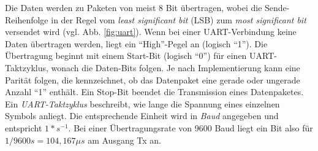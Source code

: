 Die Daten werden zu Paketen von meist 8 Bit übertragen, wobei die Sende-Reihenfolge in der Regel vom \textit{least significant bit} (LSB) zum \textit{most significant bit} versendet wird (vgl. Abb. \ref{fig:uart}). Wenn bei einer UART-Verbindung keine Daten übertragen werden, liegt ein ``High''-Pegel an (logisch ``1''). Die Übertragung beginnt mit einem Start-Bit (logisch ``0'') für einen UART-Taktzyklus, wonach die Daten-Bits folgen. Je nach Implementierung kann eine Parität folgen, die kennzeichnet, ob das Datenpaket eine gerade oder ungerade Anzahl ``1'' enthält. Ein Stop-Bit beendet die Transmission eines Datenpaketes. Ein \textit{UART-Taktzyklus} beschreibt, wie lange die Spannung eines einzelnen Symbols anliegt. Die entsprechende Einheit wird in \textit{Baud} angegeben und entspricht $1 * s^{-1}$. Bei einer Übertragungsrate von 9600 Baud liegt ein Bit also für $1 / 9600s = 104,167 \mu s$ am Ausgang Tx an.

